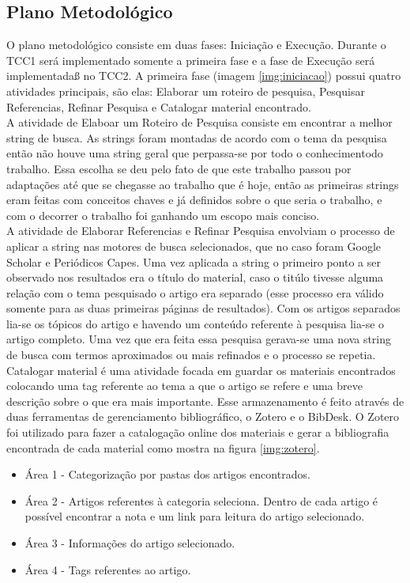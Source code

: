 \subsection{Plano Metodológico}
\label{plano_metodologico}
O plano metodológico consiste em duas fases: Iniciação e Execução. Durante o TCC1 será implementado somente a primeira fase e a fase de Execução será implementadaß no TCC2. A primeira fase (imagem \ref{img:iniciacao}) possui quatro atividades principais, são elas: Elaborar um roteiro de pesquisa, Pesquisar Referencias, Refinar Pesquisa e Catalogar material encontrado. 
\\A atividade de Elaboar um Roteiro de Pesquisa consiste em encontrar a melhor string de busca. As strings foram montadas de acordo com o tema da pesquisa então não houve uma string geral que perpassa-se por todo o conhecimentodo trabalho. Essa escolha se deu pelo fato de que este trabalho passou por adaptações até que se chegasse ao trabalho que é hoje, então as primeiras strings eram feitas com conceitos chaves e já definidos sobre o que seria o trabalho, e com o decorrer o trabalho foi ganhando um escopo mais conciso.
\\A atividade de Elaborar Referencias e Refinar Pesquisa envolviam o processo de aplicar a string nas motores de busca selecionados, que no caso foram Google Scholar e Periódicos Capes. Uma vez aplicada a string o primeiro ponto a ser observado nos resultados era o título do material, caso o titúlo tivesse alguma relação com o tema pesquisado o artigo era separado (esse processo era válido somente para as duas primeiras páginas de resultados). Com os artigos separados lia-se os tópicos do artigo e havendo um conteúdo referente à pesquisa lia-se o artigo completo. Uma vez que era feita essa pesquisa gerava-se uma nova string de busca com termos aproximados ou mais refinados e o processo se repetia.
\\Catalogar material é uma atividade focada em guardar os materiais encontrados colocando uma tag referente ao tema a que o artigo se refere e uma breve descrição sobre o que era mais importante. Esse armazenamento é feito através de duas ferramentas de gerenciamento bibliográfico, o Zotero e o BibDesk. O Zotero foi utilizado para fazer a catalogação online dos materiais e gerar a bibliografia encontrada de cada material como mostra na figura \ref{img:zotero}.
\begin{itemize}
\item Área 1 - Categorização por pastas dos artigos encontrados.
\item Área 2 - Artigos referentes à categoria seleciona. Dentro de cada artigo é possível encontrar a nota e um link para leitura do artigo selecionado.
\item Área 3 - Informações do artigo selecionado.
\item Área 4 - Tags referentes ao artigo.
\end{itemize}
